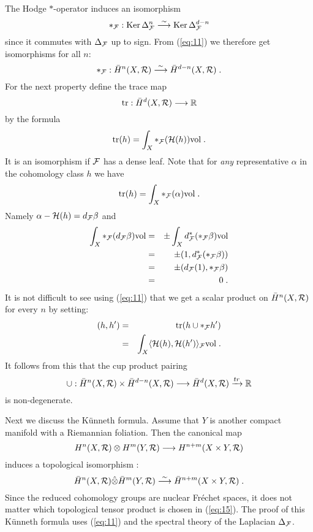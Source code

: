 \documentclass[11pt,leqno]{article}
\newcommand{\R}{{\mathbb{R}}}
\newcommand{\Ker}{\mathrm{Ker}\,}
\newcommand{\tr}{\mathrm{tr}}
\newcommand{\vol}{\mathrm{vol}}
\newcommand{\Fh}{{\cal F}}
\newcommand{\Hh}{{\mathcal H}}
\newcommand{\Rh}{{\cal R}}
\newcommand{\oH}{\bar{H}}
\newcommand{\silo}{\stackrel{\sim}{\longrightarrow}}
\begin{document}
The Hodge $*$-operator induces an isomorphism 
\[
*_{\Fh} : \Ker \Delta^n_{\Fh} \silo \Ker \Delta^{d-n}_{\Fh}
\]
since it commutes with $\Delta_{\Fh}$ up to sign. From (\ref{eq:11}) we therefore get isomorphisms for all $n$:
\begin{equation}
  \label{eq:12}
  *_{\Fh} : \oH^n (X,\Rh) \silo \oH^{d-n} (X,\Rh) \; .
\end{equation}
For the next property define the trace map
\[
\tr : \oH^d (X,\Rh) \longrightarrow \R
\]
by the formula
\[
\tr (h) = \int_X *_{\Fh} (\Hh (h)) \vol \; .
\]
It is an isomorphism if $\Fh$ has a dense leaf. Note that for {\it any} representative $\alpha$ in the cohomology class $h$ we have
\[
\tr (h) = \int_X *_{\Fh} (\alpha) \vol \; .
\]
Namely $\alpha - \Hh (h) = d_{\Fh} \beta$ and
\begin{eqnarray*}
  \int_X *_{\Fh} (d_{\Fh} \beta) \vol & = & \pm \int_X d^*_{\Fh} (*_{\Fh} \beta) \vol \\
& = &\pm ( 1 , d^*_{\Fh} (*_{\Fh} \beta)) \\
& = & \pm ( d_{\Fh} (1) , *_{\Fh} \beta)\\
& = & 0 \; .
\end{eqnarray*}
It is not difficult to see using (\ref{eq:11}) that we get a scalar product on $\oH^n (X,\Rh)$ for every $n$ by setting:
\begin{eqnarray}
  \label{eq:13}
  (h,h') & = & \tr (h \cup *_{\Fh} h') \\
& = & \int_X \langle \Hh (h) , \Hh (h') \rangle_{\Fh} \vol \; . \nonumber
\end{eqnarray}
It follows from this that the cup product pairing 
\begin{equation}
  \label{eq:14}
  \cup : \oH^n (X,\Rh) \times \oH^{d-n} (X,\Rh) \longrightarrow \oH^d (X,\Rh) \xrightarrow{tr} \R
\end{equation}
is non-degenerate.

Next we discuss the K\"unneth formula. Assume that $Y$ is another compact manifold with a Riemannian foliation. Then the canonical map
\[
H^n (X,\Rh) \otimes H^m (Y,\Rh) \longrightarrow H^{n+m} (X \times Y, \Rh)
\]
induces a topological isomorphism \cite{M}:
\begin{equation}
  \label{eq:15}
  \oH^n (X,\Rh) \hat{\otimes} \oH^m (Y,\Rh) \silo \oH^{n+m} (X \times Y,\Rh) \; .
\end{equation}
Since the reduced cohomology groups are nuclear Fr\'echet spaces, it does not matter which topological tensor product is chosen in (\ref{eq:15}). The proof of this K\"unneth formula uses (\ref{eq:11}) and the spectral theory of the Laplacian $\Delta_{\Fh}$.
\end{document}

